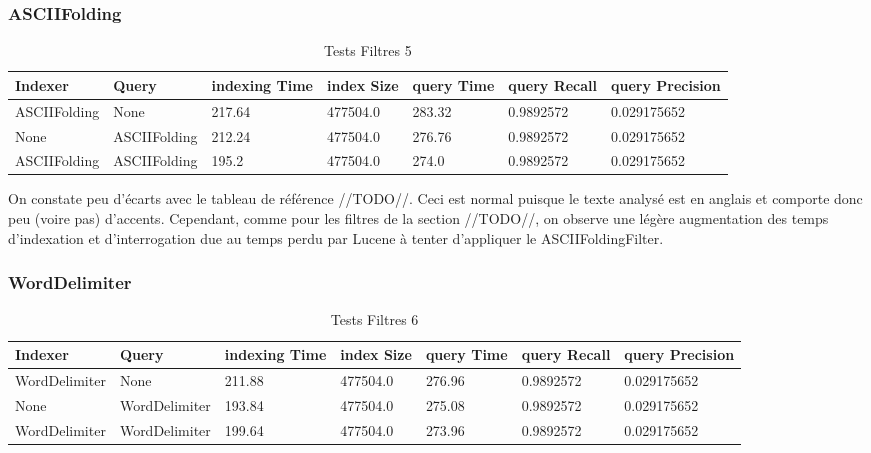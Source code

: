 \subsubsection{ASCIIFolding}

\begin{table}[H]
                \centering
                \begin{tabular}{|p{2cm}|p{2cm}|p{2cm}|p{2cm}|p{2cm}|p{2cm}|p{2cm}|}
                    \hline
                    \textbf{Indexer} & \textbf{Query} & \textbf{indexing Time} & \textbf{index Size} & \textbf{query Time} & \textbf{query Recall} & \textbf{query Precision}\\
                    \hline
ASCIIFolding & None & 217.64 & 477504.0 & 283.32 & 0.9892572 & 0.029175652\\
		\hline
None & ASCIIFolding & 212.24 & 477504.0 & 276.76 & 0.9892572 & 0.029175652\\
		\hline
ASCIIFolding & ASCIIFolding & 195.2 & 477504.0 & 274.0 & 0.9892572 & 0.029175652\\
                    \hline
                \end{tabular}
                \caption{Tests Filtres 5}
                \label{tab:tests_filtres_5}
            \end{table}

On constate peu d’écarts avec le tableau de référence //TODO//. Ceci est normal puisque le texte analysé est en anglais et comporte donc peu (voire pas) d’accents. Cependant, comme pour les filtres de la section //TODO//, on observe une légère augmentation des temps d’indexation et d’interrogation due au temps perdu par Lucene à tenter d’appliquer le ASCIIFoldingFilter.

\subsubsection{WordDelimiter}

\begin{table}[H]
                \centering
                \begin{tabular}{|p{2cm}|p{2cm}|p{2cm}|p{2cm}|p{2cm}|p{2cm}|p{2cm}|}
                    \hline
                    \textbf{Indexer} & \textbf{Query} & \textbf{indexing Time} & \textbf{index Size} & \textbf{query Time} & \textbf{query Recall} & \textbf{query Precision}\\
                    \hline
WordDelimiter & None & 211.88 & 477504.0 & 276.96 & 0.9892572 & 0.029175652\\
		\hline
None & WordDelimiter & 193.84 & 477504.0 & 275.08 & 0.9892572 & 0.029175652\\
		\hline
WordDelimiter & WordDelimiter & 199.64 & 477504.0 & 273.96 & 0.9892572 & 0.029175652\\
                    \hline
                \end{tabular}
                \caption{Tests Filtres 6}
                \label{tab:tests_filtres_6}
            \end{table}

